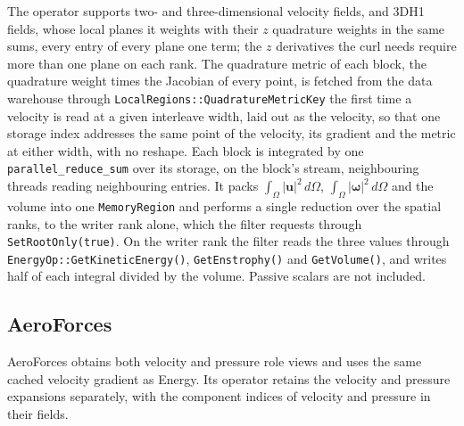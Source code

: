 The operator supports two- and three-dimensional velocity fields, and 3DH1
fields, whose local planes it weights with their $z$ quadrature weights in the
same sums, every entry of every plane one term; the $z$ derivatives the curl
needs require more than one plane on each rank. The quadrature metric of each block, the quadrature weight times the Jacobian of
every point, is fetched from the data warehouse through
\texttt{LocalRegions::QuadratureMetricKey} the first time a velocity is read
at a given interleave width, laid out as the velocity, so that one storage
index addresses the same point of the velocity, its gradient and the metric at
either width, with no reshape. Each
block is integrated by one \texttt{parallel\_reduce\_sum} over its storage,
on the block's stream, neighbouring threads reading neighbouring entries. It
packs
$\int_\Omega |\mathbf{u}|^2\,d\Omega$, $\int_\Omega |\boldsymbol{\omega}|^2
\,d\Omega$ and the volume into one \texttt{MemoryRegion} and performs a single
reduction over the spatial ranks, to the writer rank alone, which the filter
requests through \texttt{SetRootOnly(true)}. On the writer rank the filter reads the three
values through \texttt{EnergyOp::GetKineticEnergy()}, \texttt{GetEnstrophy()}
and \texttt{GetVolume()}, and writes half of each integral divided by the
volume. Passive scalars are not included.
\subsection{AeroForces}

AeroForces obtains both velocity and pressure role views and uses the same
cached velocity gradient as Energy. Its operator retains the velocity and
pressure expansions separately, with the component indices of velocity and
pressure in their fields.

